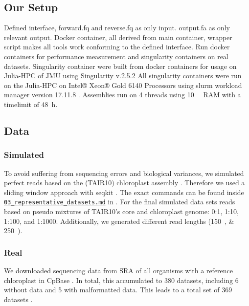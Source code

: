 \documentclass{bmcart}
\newcommand{\zenododataset}{\cite{zenododataset}}
\begin{document}
\subsection*{Our Setup}
Defined interface, forward.fq and reverse.fq as only input. output.fa as only relevant output.
Docker container, all derived from main container, wrapper script makes all tools work conforming to the defined interface. Run docker containers for performance measurement and singularity containers on real datasets.
Singularity container were built from docker containers for usage on Julia-HPC of JMU using Singularity v.2.5.2 \cite{kurtzer2017singularity}
All singularity containers were run on the Julia-HPC on Intel® Xeon® Gold \num{6140} Processors using slurm workload manager version 17.11.8 \cite{Jette02slurm}. Assemblies run on \num{4} threads using \SI{10}{\gibi\byte} RAM with a timelimit of \SI{48}{\hour}. 
\subsection*{Data}
\subsubsection*{Simulated}
To avoid suffering from sequencing errors and biological variances, we simulated perfect reads based on the  (TAIR10) chloroplast assembly \cite{tair10}.
Therefore we used a sliding window approach with seqkit \cite{seqkit}. The exact commands can be found inside \href{https://github.com/chloroExtractorTeam/benchmark/blob/master/03_representative_datasets.md}{\texttt{03\_representative\_datasets.md}} in \zenododataset{}.
For the final simulated data sets reads based on pseudo mixtures of TAIR10's core and chloroplast genome:  \num{0}:\num{1}, \num{1}:\num{10}, \num{1}:\num{100}, and \num{1}:\num{1000}.
Additionally, we generated different read lengths (\SIlist{150;250}{\basepair}).


\subsubsection*{Real}
We downloaded sequencing data from SRA \cite{sra2010} of all organisms with a reference
chloroplast in CpBase \cite{cpbase}. In total, this accumulated to \num{380} datasets, including \num{6} without data and \num{5} with malformatted data. This leads to a total set of \num{369} datasets .
\end{document}
